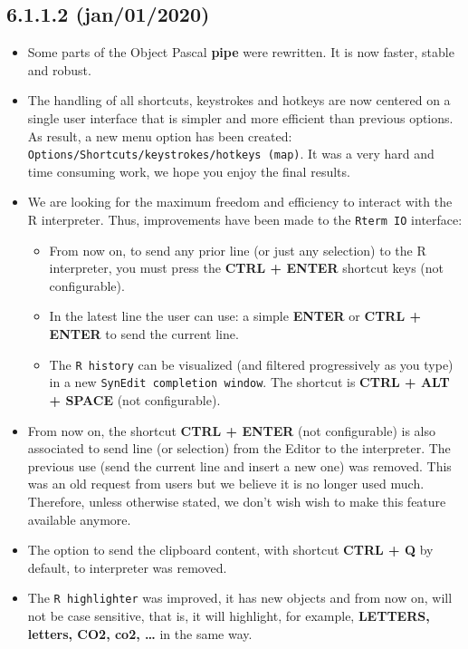 \subsection*{6.1.1.2 (jan/01/2020)}
\begin{itemize}
  \item Some parts of the Object Pascal \textbf{pipe} were rewritten. It is now faster, stable and robust.
  \item The handling of all shortcuts, keystrokes and hotkeys are now centered on a single user interface
    that is simpler and more efficient than previous options. As result, a new menu option has been
    created: \texttt{Options/Shortcuts/keystrokes/hotkeys (map)}. It was a very hard and time consuming work,
    we hope you enjoy the final results.
  \item We are looking for the maximum freedom and efficiency to interact with the R interpreter.
    Thus, improvements have been made to the \texttt{Rterm IO} interface:
    \begin{itemize}
      \item From now on, to send any prior line (or just any selection) to the R interpreter, you must press the
        \textbf{CTRL + ENTER} shortcut keys (not configurable).
      \item In the latest line the user can use: a simple \textbf{ENTER} or \textbf{CTRL + ENTER} to send the current line.
      \item The \texttt{R history} can be visualized (and filtered progressively as you type) in a new \texttt{SynEdit completion window}.
        The shortcut is \textbf{CTRL + ALT + SPACE} (not configurable).
    \end{itemize}
  \item From now on, the shortcut \textbf{CTRL + ENTER} (not configurable) is also associated to send line (or selection) from the
    Editor to the \RR{} interpreter. The previous use (send the current line and insert a new one) was removed. This was an old request
    from users but we believe it is no longer used much. Therefore, unless otherwise stated, we don't wish wish to make this feature available anymore.
  \item The option to send the clipboard content, with shortcut \textbf{CTRL + Q} by default, to \RR{} interpreter was removed.
  \item The \texttt{R highlighter} was improved, it has new objects and from now on, will not be case sensitive, that is, it will highlight, for example,
    \textbf{LETTERS, letters, CO2, co2, \ldots} in the same way.

\end{itemize}
